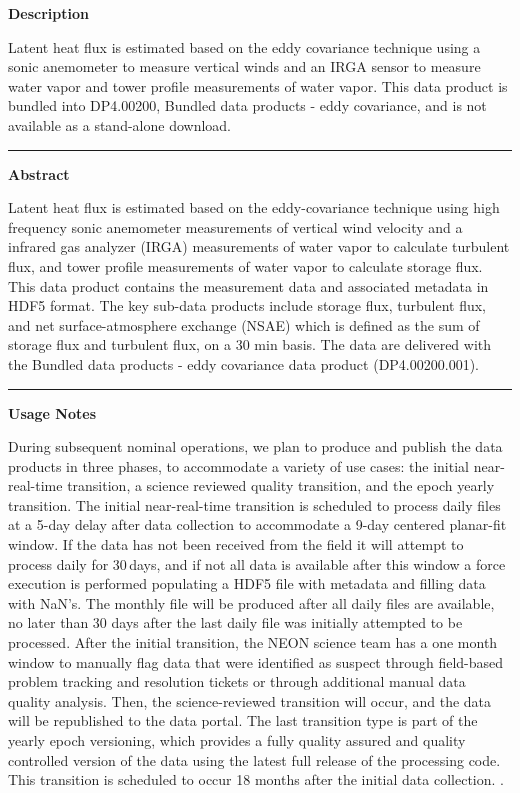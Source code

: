 \documentclass[]{article}
\begin{document}
\textbf{Description}

Latent heat flux is estimated based on the eddy covariance technique
using a sonic anemometer to measure vertical winds and an IRGA sensor to
measure water vapor and tower profile measurements of water vapor. This
data product is bundled into DP4.00200, Bundled data products - eddy
covariance, and is not available as a stand-alone download.

\begin{center}\rule{0.5\linewidth}{\linethickness}\end{center}

\textbf{Abstract}

Latent heat flux is estimated based on the eddy-covariance technique
using high frequency sonic anemometer measurements of vertical wind
velocity and a infrared gas analyzer (IRGA) measurements of water vapor
to calculate turbulent flux, and tower profile measurements of water
vapor to calculate storage flux. This data product contains the
measurement data and associated metadata in HDF5 format. The key
sub-data products include storage flux, turbulent flux, and net
surface-atmosphere exchange (NSAE) which is defined as the sum of
storage flux and turbulent flux, on a 30 min basis. The data are
delivered with the Bundled data products - eddy covariance data product
(DP4.00200.001).

\begin{center}\rule{0.5\linewidth}{\linethickness}\end{center}

\textbf{Usage Notes}

During subsequent nominal operations, we plan to produce and publish the
data products in three phases, to accommodate a variety of use cases:
the initial near-real-time transition, a science reviewed quality
transition, and the epoch yearly transition. The initial near-real-time
transition is scheduled to process daily files at a 5-day delay after
data collection to accommodate a 9-day centered planar-fit window. If
the data has not been received from the field it will attempt to process
daily for 30\,days, and if not all data is available after this window a
force execution is performed populating a HDF5 file with metadata and
filling data with NaN's. The monthly file will be produced after all
daily files are available, no later than 30 days after the last daily
file was initially attempted to be processed. After the initial
transition, the NEON science team has a one month window to manually
flag data that were identified as suspect through field-based problem
tracking and resolution tickets or through additional manual data
quality analysis. Then, the science-reviewed transition will occur, and
the data will be republished to the data portal. The last transition
type is part of the yearly epoch versioning, which provides a fully
quality assured and quality controlled version of the data using the
latest full release of the processing code. This transition is scheduled
to occur 18 months after the initial data collection. \newpage
.
\end{document}
